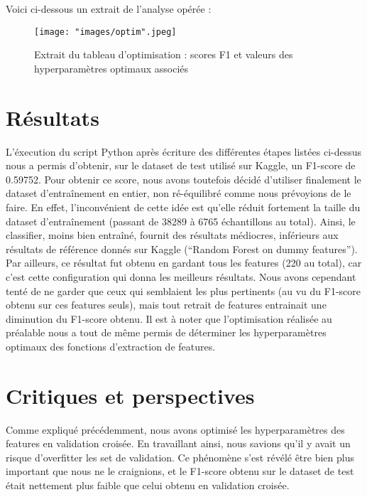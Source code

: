 \documentclass{article}
\begin{document}
Voici ci-dessous un extrait de l'analyse opérée :\\

\begin{figure}[h]
\begin{center}
\texttt{[image: "images/optim".jpeg]}
\caption{Extrait du tableau d'optimisation : scores F1 et valeurs des hyperparamètres optimaux associés}
\end{center}
\end{figure}



\section{\hspace{0.3cm} Résultats}

L'éxecution du script Python après écriture des différentes étapes listées ci-dessus nous a permis d'obtenir, sur le dataset de test utilisé sur Kaggle, un F1-score de 0.59752. Pour obtenir ce score, nous avons toutefois décidé d'utiliser finalement le dataset d'entraînement en entier, non ré-équilibré comme nous prévoyions de le faire. En effet, l'inconvénient de cette idée est qu'elle réduit fortement la taille du dataset d'entraînement (passant de 38289 à 6765 échantillons au total). Ainsi, le classifier, moins bien entraîné, fournit des résultats médiocres, inférieurs aux résultats de référence donnés sur Kaggle (``Random Forest on dummy features''). Par ailleurs, ce résultat fut obtenu en gardant tous les features (220 au total), car c'est cette configuration qui donna les meilleurs résultats. Nous avons cependant tenté de ne garder que ceux qui semblaient les plus pertinents (au vu du F1-score obtenu sur ces features seuls), mais tout retrait de features entrainait une diminution du F1-score obtenu. Il est à noter que l'optimisation réalisée au préalable nous a tout de même permis de déterminer les hyperparamètres optimaux des fonctions d'extraction de features.


\section{\hspace{0.3cm} Critiques et perspectives}

Comme expliqué précédemment, nous avons optimisé les hyperparamètres des features en validation croisée. En travaillant ainsi, nous savions qu'il y avait un risque d'overfitter les set de validation. Ce phénomène s'est révélé être bien plus important que nous ne le craignions, et le F1-score obtenu sur le dataset de test était nettement plus faible que celui obtenu en validation croisée.
\end{document}
